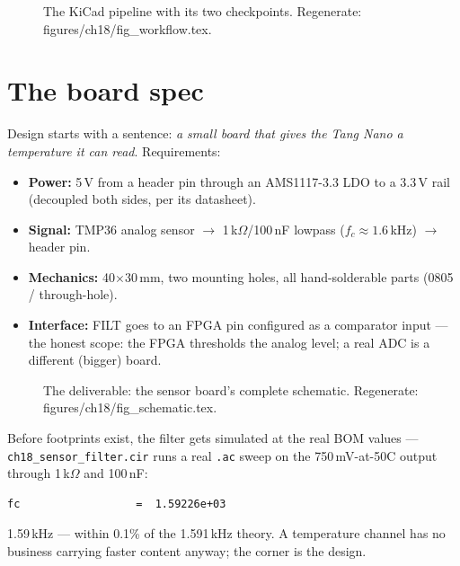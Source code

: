 \begin{figure}[htbp]
\centering

\caption{The KiCad pipeline with its two checkpoints. Regenerate:
\ttfamily figures/ch18/fig\_workflow.tex.}
\label{fig:workflow18}
\end{figure}

\section{The board spec}\label{sec:spec18}

Design starts with a sentence: \emph{a small board that gives the
Tang Nano a temperature it can read}. Requirements:

\begin{itemize}
\item \textbf{Power:} 5\,V from a header pin through an AMS1117-3.3
LDO to a 3.3\,V rail (decoupled both sides, per its datasheet).
\item \textbf{Signal:} TMP36 analog sensor $\to$ 1\,k$\Omega$/100\,nF
lowpass ($f_c\approx1.6$\,kHz) $\to$ header pin.
\item \textbf{Mechanics:} 40$\times$30\,mm, two mounting holes,
all hand-solderable parts (0805 / through-hole).
\item \textbf{Interface:} FILT goes to an FPGA pin configured as a
comparator input --- the honest scope: the FPGA thresholds the analog
level; a real ADC is a different (bigger) board.
\end{itemize}

\begin{figure}[htbp]
\centering

\caption{The deliverable: the sensor board's complete schematic.
Regenerate: \ttfamily figures/ch18/fig\_schematic.tex.}
\label{fig:schematic18}
\end{figure}

\begin{example}
Before footprints exist, the filter gets simulated at the real BOM
values --- \texttt{ch18\_sensor\_filter.cir} runs a real \texttt{.ac}
sweep on the 750\,mV-at-50\textdegree C output through 1\,k$\Omega$
and 100\,nF:

\begin{lstlisting}[caption={Real ngspice output --- the filter's
measured corner matches the 1/(2$\pi$RC) prediction.}]
fc                  =  1.59226e+03
\end{lstlisting}

1.59\,kHz --- within 0.1\% of the 1.591\,kHz theory. A temperature
channel has no business carrying faster content anyway; the corner
is the design.
\end{example}

